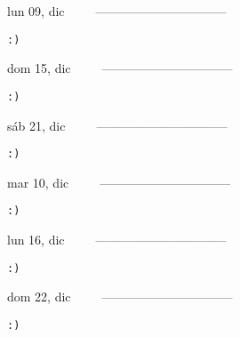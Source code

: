 \documentclass[letterpaper,10pt]{article}
\begin{document}
\begin{multicols}{3}
{lun 09, dic\ \ \ \ \ --------------------------------}
\begin{flushright}\begin{small}\texttt{:)}\end{small}\end{flushright}
\vfill
{dom 15, dic\ \ \ \ \ --------------------------------}
\begin{flushright}\begin{small}\texttt{:)}\end{small}\end{flushright}\par
\vfill
{sáb 21, dic\ \ \ \ \ --------------------------------}
\begin{flushright}\begin{small}\texttt{:)}\end{small}\end{flushright}\par
\vfill
\end{multicols}
\vspace{1.05cm}

\begin{multicols}{3}
{mar 10, dic\ \ \ \ \ --------------------------------}
\begin{flushright}\begin{small}\texttt{:)}\end{small}\end{flushright}
\vfill
{lun 16, dic\ \ \ \ \ --------------------------------}
\begin{flushright}\begin{small}\texttt{:)}\end{small}\end{flushright}\par
\vfill
{dom 22, dic\ \ \ \ \ --------------------------------}
\begin{flushright}\begin{small}\texttt{:)}\end{small}\end{flushright}\par
\vfill
\end{multicols}
\vspace{1.05cm}
\end{document}
